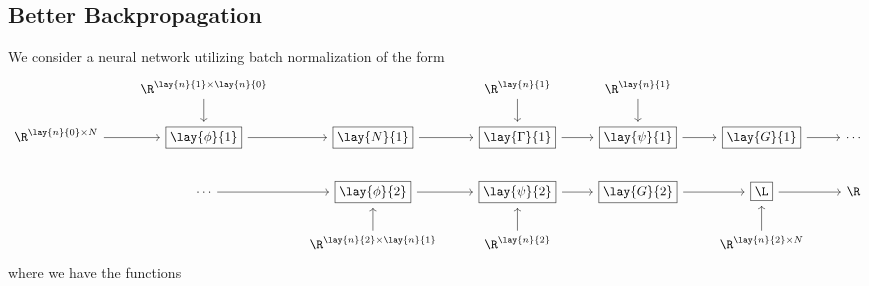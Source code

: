 




\subsection{Better Backpropagation}

We consider a neural network utilizing batch normalization of the form
{\tiny
\begin{equation*}
	\begin{tikzcd}
		{}
		&\R^{\lay{n}{1}\times\lay{n}{0}}
		\arrow[d]
		&{}
		&\R^{\lay{n}{1}}
		\arrow[d]
		&\R^{\lay{n}{1}}
		\arrow[d]
		&{}
		\\
		\R^{\lay{n}{0}\times N}
		\arrow[r]
		&\boxed{\lay{\phi}{1}}
		\arrow[r]
		&\boxed{\lay{N}{1}}
		\arrow[r]
		&\boxed{\lay{\Gamma}{1}}
		\arrow[r]
		&\boxed{\lay{\psi}{1}}
		\arrow[r]
		&\boxed{\lay{G}{1}}
		\arrow[r]
		&\cdots\\
		{}
		&\cdots
		\arrow[r]
		&\boxed{\lay{\phi}{2}}
		\arrow[r]
		&\boxed{\lay{\psi}{2}}
		\arrow[r]
		&\boxed{\lay{G}{2}}
		\arrow[r]
		&\boxed{\L}
		\arrow[r]
		&\R
		\\
		{}
		&{}
		&\R^{\lay{n}{2}\times\lay{n}{1}}
		\arrow[u]
		&\R^{\lay{n}{2}}
		\arrow[u]
		&{}
		&\R^{\lay{n}{2}\times N}
		\arrow[u]
		&{}
	\end{tikzcd}
\end{equation*}
}
where we have the functions
